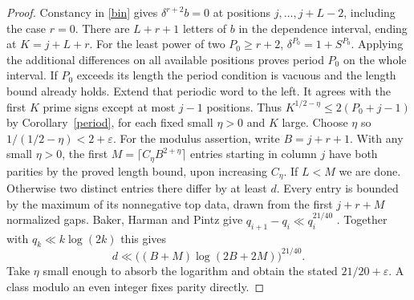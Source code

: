 \documentclass[11pt,a4paper]{article}
\newcommand{\eps}{\varepsilon}
\begin{document}
\begin{proof}
Constancy in \eqref{bin} gives $\delta^{r+2}b=0$ at positions $j,\ldots,j+L-2$, including the case $r=0$. There are $L+r+1$ letters of $b$ in the dependence interval, ending at $K=j+L+r$. For the least power of two $P_0\ge r+2$, $\delta^{P_0}=1+S^{P_0}$. Applying the additional differences on all available positions proves period $P_0$ on the whole interval. If $P_0$ exceeds its length the period condition is vacuous and the length bound already holds. Extend that periodic word to the left. It agrees with the first $K$ prime signs except at most $j-1$ positions. Thus $K^{1/2-\eta}\le 2(P_0+j-1)$ by Corollary~\ref{period}, for each fixed small $\eta>0$ and $K$ large. Choose $\eta$ so $1/(1/2-\eta)<2+\eps$.
\smallskip
For the modulus assertion, write $B=j+r+1$. With any small $\eta>0$, the first $M=\lceil C_\eta B^{2+\eta}\rceil$ entries starting in column $j$ have both parities by the proved length bound, upon increasing $C_\eta$. If $L<M$ we are done. Otherwise two distinct entries there differ by at least $d$. Every entry is bounded by the maximum of its nonnegative top data, drawn from the first $j+r+M$ normalized gaps. Baker, Harman and Pintz give $q_{i+1}-q_i\ll q_i^{21/40}$ \cite{bhp}. Together with $q_k\ll k\log(2k)$ this gives
\[
                   d\ll \big((B+M)\log(2B+2M)\big)^{21/40}.
\]
Take $\eta$ small enough to absorb the logarithm and obtain the stated $21/20+\eps$. A class modulo an even integer fixes parity directly.
\end{proof}
\newpage
\end{document}
